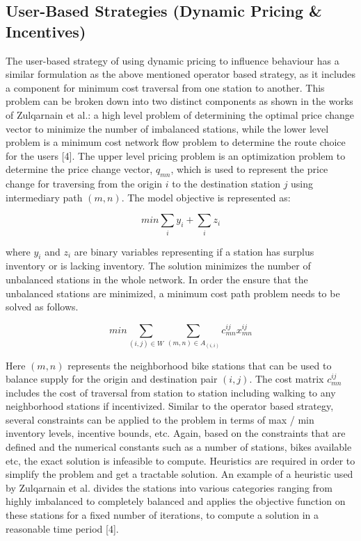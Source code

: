 \documentclass[conference]{IEEEtran}
\begin{document}
\subsection{User-Based Strategies (Dynamic Pricing \& Incentives)}
The user-based strategy of using dynamic pricing to influence behaviour has a similar formulation as the above mentioned operator based strategy, as it includes a component for minimum cost traversal from one station to another. This problem can be broken down into two distinct components as shown in the works of Zulqarnain et al.: a high level problem of determining the optimal price change vector to minimize the number of imbalanced stations, while the lower level problem is a minimum cost network flow problem to determine the route choice for the users [4]. The upper level pricing problem is an optimization problem to determine the price change vector, $q_{mn}$, which is used to represent the price change for traversing from the origin $i$ to the destination station $j$ using intermediary path $(m, n)$. The model objective is represented as:  

\begin{equation}
		 min \sum_{i} y_{i} + \sum_{i} z_{i}
\end{equation}

where $y_{i}$ and $z_{i}$ are binary variables representing if a station has surplus inventory or is lacking inventory. The solution minimizes the number of unbalanced stations in the whole network. In order the ensure that the unbalanced stations are minimized, a minimum cost path problem needs to be solved as follows.

\begin{equation}
min \sum_{(i,j)\in W} \sum_{(m,n) \in A_{(i,i)}}c_{mn}^{ij}x_{mn}^{ij}
\end{equation}

Here $(m, n)$ represents the neighborhood bike stations that can be used to balance supply for the origin and destination pair $(i, j)$. The cost matrix $c_{mn}^{ij}$ includes the cost of traversal from station to station including walking to any neighborhood stations if incentivized. Similar to the operator based strategy, several constraints can be applied to the problem in terms of max / min inventory levels, incentive bounds, etc. Again, based on the constraints that are defined and the numerical constants such as a number of stations, bikes available etc, the exact solution is infeasible to compute. Heuristics are required in order to simplify the problem and get a tractable solution. An example of a heuristic used by Zulqarnain et al. divides the stations into various categories ranging from highly imbalanced to completely balanced and applies the objective function on these stations for a fixed number of iterations, to compute a solution in a reasonable time period [4]. 
\end{document}
